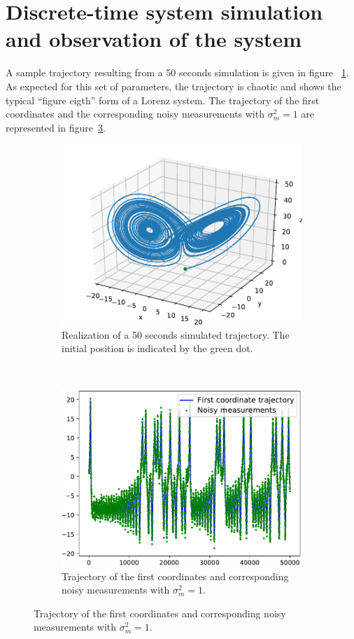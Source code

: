 \documentclass[english, DIV=13]{scrartcl}
\begin{document}
\section{Discrete-time system simulation and observation of the system}
A sample trajectory resulting from a 50 seconds simulation is given in figure~
\ref{fig:q2-3d-trajectory}. As expected for this set of parameters, the trajectory
is chaotic and shows the typical ``figure eigth'' form of a Lorenz system. 
The trajectory of the first coordinates and the corresponding noisy measurements
with $\sigma^2_m = 1$ are represented in figure~\ref{fig:q2-mes-vs-real}.
\begin{figure}[hb]
    \centering
    \begin{subfigure}{0.49\textwidth}
        \includegraphics[width=\textwidth]{figures/q2-3d-trajectory}
        \caption{Realization of a 50 seconds simulated trajectory. The initial
        position is indicated by the green dot.}
        \label{fig:q2-3d-trajectory}
    \end{subfigure}%
    ~
    \begin{subfigure}{0.49\textwidth}
        \includegraphics[width=\textwidth]{figures/q2-mes-vs-real}
        \caption{Trajectory of the first coordinates and corresponding noisy
        measurements with $\sigma^2_m = 1$.}
        \label{fig:q2-mes-vs-real}
    \end{subfigure}


\end{figure}
\end{document}
